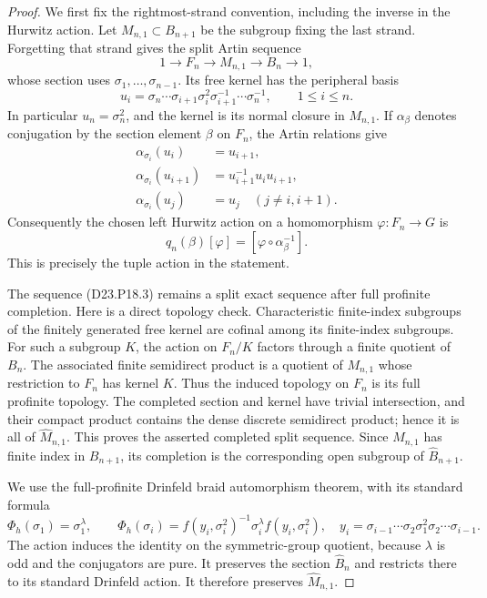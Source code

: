 \begin{proof}
We first fix the rightmost-strand convention, including the
inverse in the Hurwitz action. Let $M_{n,1}\subset B_{n+1}$
be the subgroup fixing the last strand. Forgetting that strand
gives the split Artin sequence
\[
 1\longrightarrow F_n\longrightarrow M_{n,1}
   \longrightarrow B_n\longrightarrow1,
 \tag{D23.P18.3}
\]
whose section uses $\sigma_1,\ldots,\sigma_{n-1}$. Its free
kernel has the peripheral basis
\[
 u_i=\sigma_n\cdots\sigma_{i+1}\sigma_i^2
          \sigma_{i+1}^{-1}\cdots\sigma_n^{-1},
 \qquad 1\le i\le n.
\]
In particular $u_n=\sigma_n^2$, and the kernel is its normal
closure in $M_{n,1}$. If $\alpha_\beta$ denotes conjugation by
the section element $\beta$ on $F_n$, the Artin relations give
\[
\begin{split}
 \alpha_{\sigma_i}(u_i)&=u_{i+1},\\
 \alpha_{\sigma_i}(u_{i+1})&=u_{i+1}^{-1}u_i u_{i+1},\\
 \alpha_{\sigma_i}(u_j)&=u_j\quad(j\ne i,i+1).
\end{split}                                                 \tag{D23.P18.4}
\]
Consequently the chosen left Hurwitz action on a homomorphism
$\varphi:F_n\to G$ is
\[
 q_n(\beta)[\varphi]=[\varphi\circ\alpha_\beta^{-1}].
 \tag{D23.P18.5}
\]
This is precisely the tuple action in the statement.

The sequence (D23.P18.3) remains a split exact sequence after
full profinite completion. Here is a direct topology check.
Characteristic finite-index subgroups of the finitely generated
free kernel are cofinal among its finite-index subgroups. For
such a subgroup $K$, the action on $F_n/K$ factors through a
finite quotient of $B_n$. The associated finite semidirect
product is a quotient of $M_{n,1}$ whose restriction to $F_n$
has kernel $K$. Thus the induced topology on $F_n$ is its full
profinite topology. The completed section and kernel have
trivial intersection, and their compact product contains the
dense discrete semidirect product; hence it is all of
$\widehat M_{n,1}$. This proves the asserted completed split
sequence. Since $M_{n,1}$ has finite index in $B_{n+1}$, its
completion is the corresponding open subgroup of
$\widehat B_{n+1}$.

We use the full-profinite Drinfeld braid automorphism theorem,
with its standard formula
\[
 \Phi_h(\sigma_1)=\sigma_1^\lambda,
 \qquad
 \Phi_h(\sigma_i)=f(y_i,\sigma_i^2)^{-1}
        \sigma_i^\lambda f(y_i,\sigma_i^2),
\quad
 y_i=\sigma_{i-1}\cdots\sigma_2\sigma_1^2
            \sigma_2\cdots\sigma_{i-1}.
 \tag{D23.P18.6}
\]
The action induces the identity on the symmetric-group
quotient, because $\lambda$ is odd and the conjugators are
pure. It preserves the section $\widehat B_n$ and restricts
there to its standard Drinfeld action. It therefore preserves
$\widehat M_{n,1}$.


\end{proof}
